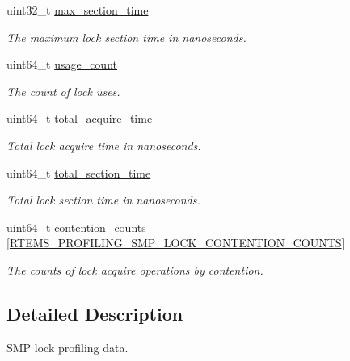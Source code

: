 \begin{DoxyCompactItemize}
\mbox{\label{structrtems__profiling__smp__lock_afdbd4993041bea57822a1464ca7a8152}} 
uint32\+\_\+t \mbox{\hyperlink{structrtems__profiling__smp__lock_afdbd4993041bea57822a1464ca7a8152}{max\+\_\+section\+\_\+time}}
\begin{DoxyCompactList}\small\item\em The maximum lock section time in nanoseconds. \end{DoxyCompactList}\item 
uint64\+\_\+t \mbox{\hyperlink{structrtems__profiling__smp__lock_a2861d4f260254672389b9e1be535618e}{usage\+\_\+count}}
\begin{DoxyCompactList}\small\item\em The count of lock uses. \end{DoxyCompactList}\item 
uint64\+\_\+t \mbox{\hyperlink{structrtems__profiling__smp__lock_a74e0ea0fae764222e7107c522f2bc1b6}{total\+\_\+acquire\+\_\+time}}
\begin{DoxyCompactList}\small\item\em Total lock acquire time in nanoseconds. \end{DoxyCompactList}\item 
uint64\+\_\+t \mbox{\hyperlink{structrtems__profiling__smp__lock_a71568f2195b61fdb8ed2e2892dfb3bb8}{total\+\_\+section\+\_\+time}}
\begin{DoxyCompactList}\small\item\em Total lock section time in nanoseconds. \end{DoxyCompactList}\item 
uint64\+\_\+t \mbox{\hyperlink{structrtems__profiling__smp__lock_af113eb6e40d7caf6cf0c40d4e9446c21}{contention\+\_\+counts}} \mbox{[}\mbox{\hyperlink{group__Profiling_gaa982fd0b6f3e7e29927a4efa146eb7ad}{R\+T\+E\+M\+S\+\_\+\+P\+R\+O\+F\+I\+L\+I\+N\+G\+\_\+\+S\+M\+P\+\_\+\+L\+O\+C\+K\+\_\+\+C\+O\+N\+T\+E\+N\+T\+I\+O\+N\+\_\+\+C\+O\+U\+N\+TS}}\mbox{]}
\begin{DoxyCompactList}\small\item\em The counts of lock acquire operations by contention. \end{DoxyCompactList}\end{DoxyCompactItemize}


\subsection{Detailed Description}
S\+MP lock profiling data. 


